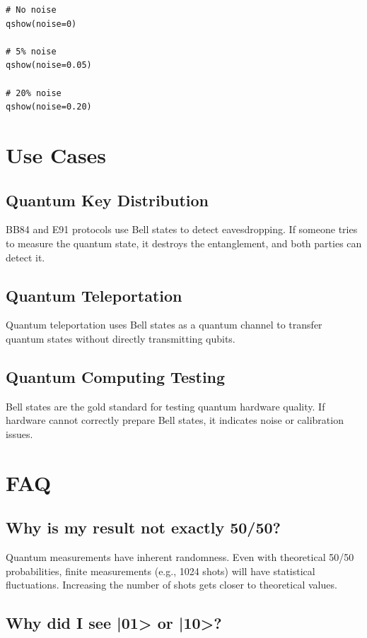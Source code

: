 \documentclass[12pt,a4paper]{article}
\begin{document}
\begin{verbatim}
# No noise
qshow(noise=0)

# 5% noise
qshow(noise=0.05)

# 20% noise
qshow(noise=0.20)
\end{verbatim}

\section{Use Cases}

\subsection{Quantum Key Distribution}

BB84 and E91 protocols use Bell states to detect eavesdropping. If someone tries to measure the quantum state, it destroys the entanglement, and both parties can detect it.

\subsection{Quantum Teleportation}

Quantum teleportation uses Bell states as a quantum channel to transfer quantum states without directly transmitting qubits.

\subsection{Quantum Computing Testing}

Bell states are the gold standard for testing quantum hardware quality. If hardware cannot correctly prepare Bell states, it indicates noise or calibration issues.

\section{FAQ}

\subsection{Why is my result not exactly 50/50?}

Quantum measurements have inherent randomness. Even with theoretical 50/50 probabilities, finite measurements (e.g., 1024 shots) will have statistical fluctuations. Increasing the number of shots gets closer to theoretical values.

\subsection{Why did I see |01> or |10>?}
\end{document}
